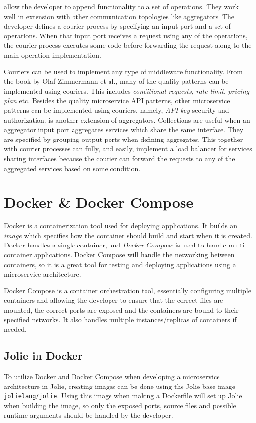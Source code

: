   allow the developer to append functionality to a set of operations. They work well in extension with other communication topologies like aggregators.
The developer defines a courier process by specifying an input port and a set of operations. When that input port receives a request using any of the operations, the courier process executes some code before forwarding
the request along to the main operation implementation.

Couriers can be used to implement any type of middleware functionality. From the book by Olaf Zimmermann et al., many of the quality patterns can be implemented using couriers. This includes
\textit{conditional requests}, \textit{rate limit}, \textit{pricing plan} etc. Besides the quality microservice API patterns, other microservice patterns can be implemented using couriers, namely, \textit{API key} security and authorization.
 is another extension of aggregators. Collections are useful when an aggregator input port aggregates services which share the same interface.
They are specified by grouping output ports when defining aggregates.
This together with courier processes can fully, and easily, implement a load balancer for services sharing interfaces because the courier can forward the requests to any of the aggregated services based on some condition.

\section{Docker \& Docker Compose}
Docker is a containerization tool used for deploying applications. It builds an \textit{image} which specifies how the container should build and start when it is created.
Docker handles a single container, and \textit{Docker Compose} is used to handle multi-container applications. Docker Compose will handle the networking between containers, so it is a great tool for testing and deploying applications using a microservice architecture.

Docker Compose is a container orchestration tool, essentially configuring multiple containers and allowing the developer to ensure that the correct files are mounted, the correct ports are exposed and the containers are bound to their specified networks. It also handles multiple instances/replicas
of containers if needed.

\subsection{Jolie in Docker}
To utilize Docker and Docker Compose when developing a microservice architecture in Jolie, creating images can be done using the Jolie base image \texttt{jolielang/jolie}.
Using this image when making a Dockerfile will set up Jolie when building the image, so only the exposed ports, source files and possible runtime arguments should be handled by the developer.

